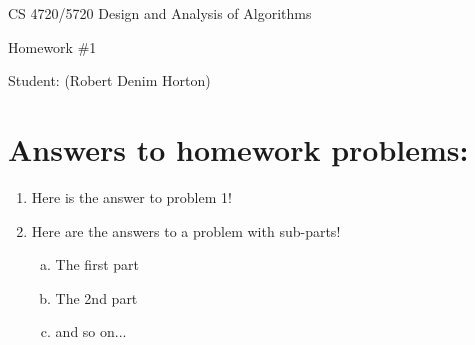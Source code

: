 \documentclass[11pt]{article}
\begin{document}
 

\rhead{\today}

\begin{center}\begin{Large}
CS 4720/5720 Design and Analysis of Algorithms

Homework \#1

Student: (Robert Denim Horton)
\end{Large}
\end{center}


\section*{Answers to homework problems:}

\begin{enumerate}
	\item Here is the answer to problem 1!
	\item  Here are the answers to a problem with sub-parts!
	\begin{enumerate}[(a)]
		\item The first part
		\item The 2nd part
		\item and so on...
	\end{enumerate}
\end{enumerate}
\end{document}

